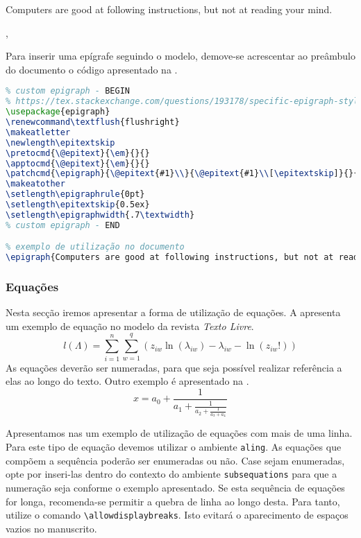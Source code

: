 \documentclass[portuguese]{textolivre}
\renewcommand\textflush{flushright}
\newlength\epitextskip
\begin{document}
\epigraph{Computers are good at following instructions, but not at reading your mind.}{, \emph{}}

Para inserir uma epígrafe seguindo o modelo, demove-se acrescentar ao preâmbulo do documento o código apresentado na .
\begin{lstlisting}[language=tex, label=lst-epigrafe, caption={Utilização de epígrafe seguindo o modelo da revista.}]
% código para ser inserido no preâmbulo
% custom epigraph - BEGIN 
% https://tex.stackexchange.com/questions/193178/specific-epigraph-style
\usepackage{epigraph}
\renewcommand\textflush{flushright}
\makeatletter
\newlength\epitextskip
\pretocmd{\@epitext}{\em}{}{}
\apptocmd{\@epitext}{\em}{}{}
\patchcmd{\epigraph}{\@epitext{#1}\\}{\@epitext{#1}\\[\epitextskip]}{}{}
\makeatother
\setlength\epigraphrule{0pt}
\setlength\epitextskip{0.5ex}
\setlength\epigraphwidth{.7\textwidth}
% custom epigraph - END

% exemplo de utilização no documento
\epigraph{Computers are good at following instructions, but not at reading your mind.}{\citefirstlastauthor{donaldknuth1984}, \emph{\citetitle{donaldknuth1984}}}
\end{lstlisting} %



\subsubsection{Equações}\label{sec-equacao}
Nesta secção iremos apresentar a forma de utilização de equações. A  apresenta um
exemplo de equação no modelo da revista \emph{Texto Livre}.
\begin{equation}
l(\Lambda)=\sum_{i=1}^{n} \sum_{w=1}^{q} (z_{i w} \ln (\lambda_{i w}) - \lambda_{i w} - \ln (z_{i w}!))
\label{eq-poisson}
\end{equation}
As equações deverão ser numeradas, para que seja possível realizar referência a elas ao longo do texto.
Outro exemplo é apresentado na .
\begin{equation}
  x = a_0 + \frac{1}{\displaystyle a_1 
          + \frac{1}{\displaystyle a_2 
          + \frac{1}{\displaystyle a_3 + a_4}}}
\label{eq-frac}
\end{equation}

Apresentamos nas  um exemplo de utilização de equações com mais de uma linha. 
Para este tipo de equação devemos utilizar o ambiente \texttt{aling}. 
As equações que compõem a sequência poderão ser enumeradas ou não. Case sejam enumeradas, opte por inseri-las dentro do contexto do ambiente 
\texttt{subsequations} para que a numeração seja conforme o exemplo apresentado.
Se esta sequência de equações for longa, recomenda-se permitir a quebra de linha ao longo desta. 
Para tanto, utilize o comando \verb|\allowdisplaybreaks|. Isto evitará o aparecimento de espaços vazios 
no manuscrito.
\end{document}
